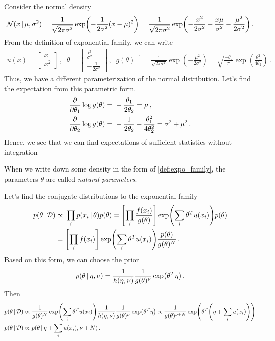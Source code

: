 \begin{example}
Consider the normal density
\begin{align}
    \Normal(x\cond \mu, \sigma^2) = \frac{1}{\sqrt{2\pi\sigma^2}}\exp\left(-\frac{1}{2\sigma^2}(x-\mu)^2\right) = \frac{1}{\sqrt{2\pi\sigma^2}}\exp\left(-\frac{x^2}{2\sigma^2} + \frac{x\mu}{\sigma^2} -\frac{\mu^2}{2\sigma^2}\right)\,.
\end{align}
From the definition of exponential family, we can write
\begin{align}
    u(x) = \begin{bmatrix}
        x\\
        x^2
    \end{bmatrix}\,,\;\;
    \theta = \begin{bmatrix}
        \frac{\mu}{\sigma^2}\\
        -\frac{1}{2\sigma^2}
    \end{bmatrix}\,,\;\;
    g(\theta)^{-1} = \frac{1}{\sqrt{2\pi\sigma^2}}\exp\left(-\frac{\mu^2}{2\sigma^2}\right) = \sqrt{\frac{-\theta_2}{\pi}}\exp\left(\frac{\theta_1^2}{4\theta_2}\right)\,.
\end{align}
Thus, we have a different parameterization of the normal distribution. Let's find the expectation from this parametric form.
\begin{align}
    \frac{\partial }{\partial \theta_1}\log g(\theta) =~& -\frac{\theta_1}{2\theta_2} = \mu\,,\\
    \frac{\partial }{\partial \theta_2}\log g(\theta) =~& -\frac{1}{2\theta_2}+\frac{\theta_1^2}{4\theta_2^2} = \sigma^2 + \mu^2\,.
\end{align}
Hence, we see that we can find expectations of sufficient statistics without integration 
\end{example}
When we write down some density in the form of \cref{def:expo_family}, the parameters $\theta$ are called \textit{natural parameters}.

Let's find the conjugate distributions to the exponential family
\begin{align}
    p(\theta\cond \mathcal{D}) \propto~& \prod_i p(x_i\cond \theta)p(\theta) = \left[\prod_i\frac{f(x_i)}{g(\theta)}\right]\exp\left(\sum_i\theta^Tu(x_i)\right)p(\theta)\\
    =~& \left[\prod_i f(x_i)\right]\exp\left(\sum_i\theta^Tu(x_i)\right)\frac{p(\theta)}{g(\theta)^N}\,.
\end{align}
Based on this form, we can choose the prior
\begin{align}
    p(\theta\cond \eta,\nu) = \frac{1}{h(\eta,\nu)}\frac{1}{g(\theta)^\nu}\exp\left(\theta^T\eta\right)\,.
\end{align}
Then
\begin{align}
    p(\theta\cond \mathcal{D}) \propto~& \frac{1}{g(\theta)^N}\exp\left(\sum_i\theta^Tu(x_i)\right)\frac{1}{h(\eta,\nu)}\frac{1}{g(\theta)^\nu}\exp\left(\theta^T\eta\right) \propto \frac{1}{g(\theta)^{\nu+N}}\exp\left(\theta^T\left(\eta +\sum_iu(x_i)\right)\right)\\
    p(\theta\cond \mathcal{D}) \propto~& p(\theta\cond \eta +\sum_iu(x_i),\nu + N)\,.
\end{align}

